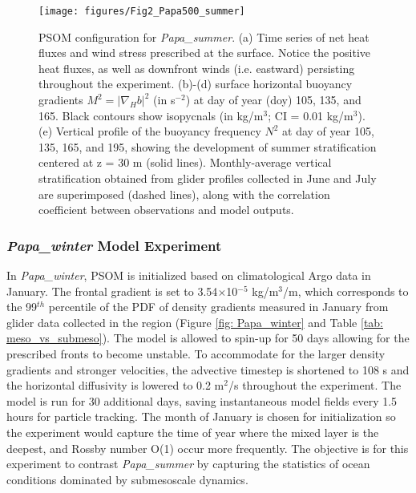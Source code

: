 \documentclass[article,linenumbers]{agujournal2018}
\begin{document}
\begin{figure}[t]
	\texttt{[image: figures/Fig2\_Papa500\_summer]}
	\caption{PSOM configuration for \textit{Papa\_summer}. (a) Time series of net heat fluxes and wind stress prescribed at the surface. Notice the positive heat fluxes, as well as downfront winds (i.e. eastward) persisting throughout the experiment. (b)-(d) surface horizontal buoyancy gradients $M^2 = |\nabla_Hb|^2$ (in s$^{-2}$) at day of year (doy) 105, 135, and 165. Black contours show isopycnals (in kg/m$^3$; CI = 0.01 kg/m$^3$). (e) Vertical profile of the buoyancy frequency $N^2$ at day of year 105, 135, 165, and 195, showing the development of summer stratification centered at z = 30 m (solid lines). Monthly-average vertical stratification obtained from glider profiles collected in June and July are superimposed (dashed lines), along with the correlation coefficient between observations and model outputs.}
	\label{fig: Papa_summer}
\end{figure} 


\subsubsection{\textit{Papa\_winter} Model Experiment}

In \textit{Papa\_winter}, PSOM is initialized based on climatological Argo data in January. The frontal gradient is set to 3.54$\times$10$^{-5}$ kg/m$^3$/m, which corresponds to the 99$^{th}$ percentile of the PDF of density gradients measured in January from glider data collected in the region (Figure \ref{fig: Papa_winter} and Table \ref{tab: meso_vs_submeso}). The model is allowed to spin-up for 50 days allowing for the prescribed fronts to become unstable. To accommodate for the larger density gradients and stronger velocities, the advective timestep is shortened to 108 s and the horizontal diffusivity is lowered to 0.2 m$^2$/s throughout the experiment. The model is run for 30 additional days, saving instantaneous model fields every 1.5 hours for particle tracking. The month of January is chosen for initialization so the experiment would capture the time of year where the mixed layer is the deepest, and Rossby number O(1) occur more frequently. The objective is for this experiment to contrast \textit{Papa\_summer} by capturing the statistics of ocean conditions dominated by submesoscale dynamics.
\end{document}
